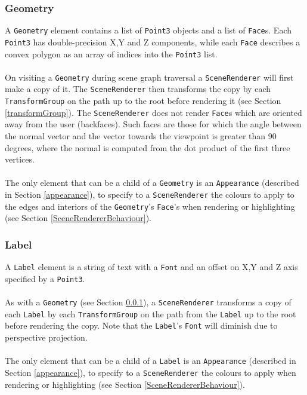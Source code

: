 \documentclass[10pt,aps, prb,preprint]{article}
\begin{document}


\subsubsection{Geometry}
\label{geometry}
A \texttt{Geometry} element contains a list of \texttt{Point3} objects and a list of \texttt{Face}s. Each \texttt{Point3} has double-precision X,Y and Z components, while each \texttt{Face} describes a convex polygon as an array of indices into the \texttt{Point3} list. 
\\
\\
On visiting a \texttt{Geometry} during scene graph traversal a \texttt{SceneRenderer} will first make a copy of it. The \texttt{SceneRenderer} then transforms the copy by each \texttt{TransformGroup} on the path up to the root before rendering it (see Section \ref{transformGroup}). The \texttt{SceneRenderer} does not render \texttt{Face}s which are oriented away from the user (backfaces). Such faces are those for which the angle between the normal vector and the vector towards the viewpoint is greater than 90 degrees, where the normal is computed from the dot product of the first three vertices. 
\\
\\
The only element that can be a child of a \texttt{Geometry} is an \texttt{Appearance} (described in Section \ref{appearance}), to specify to a \texttt{SceneRenderer} the colours to apply to the edges and interiors of the \texttt{Geometry}'s \texttt{Face}'s when rendering or highlighting (see Section \ref{SceneRendererBehaviour}).



\subsubsection{Label}
\label{label}
A \texttt{Label} element is a string of text with a \texttt{Font} and an offset on X,Y and Z axis specified by a \texttt{Point3}.
\\
\\
As with a \texttt{Geometry} (see Section \ref{geometry}), a \texttt{SceneRenderer} transforms a copy of each \texttt{Label} by each \texttt{TransformGroup} on the path from the \texttt{Label} up to the root before rendering the copy. Note that the \texttt{Label}'s \texttt{Font} will diminish due to perspective projection.
\\
\\
The only element that can be a child of a \texttt{Label} is an \texttt{Appearance} (described in Section \ref{appearance}), to specify to a \texttt{SceneRenderer} the colours to apply when rendering or highlighting (see Section \ref{SceneRendererBehaviour}).
\end{document}
